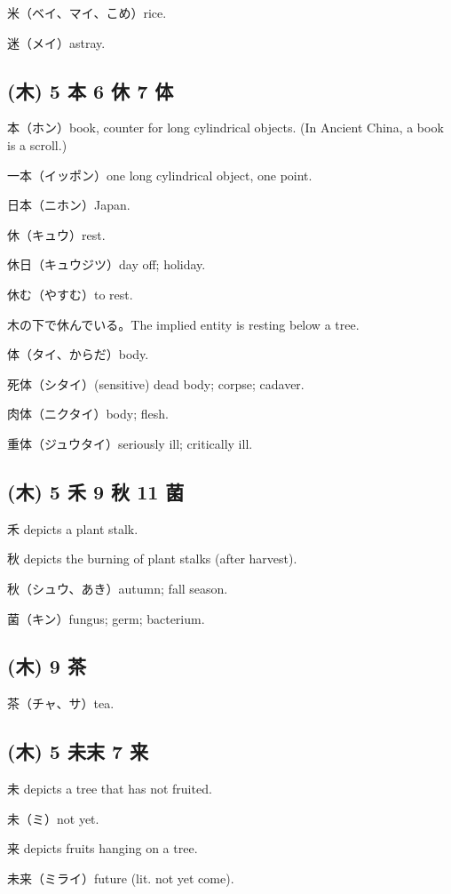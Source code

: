 米（ベイ、マイ、こめ）rice.

迷（メイ）astray.

\subsection{(木) 5 本 6 休 7 体}

本（ホン）book, counter for long cylindrical objects.
(In Ancient China, a book is a scroll.)

一本（イッポン）one long cylindrical object, one point.

日本（ニホン）Japan.

休（キュウ）rest.

休日（キュウジツ）day off; holiday.

休む（やすむ）to rest.

木の下で休んでいる。The implied entity is resting below a tree.

体（タイ、からだ）body.

死体（シタイ）(sensitive) dead body; corpse; cadaver.

肉体（ニクタイ）body; flesh.

重体（ジュウタイ）seriously ill; critically ill.

\subsection{(木) 5 禾 9 秋 11 菌}

禾 depicts a plant stalk.

秋 depicts the burning of plant stalks (after harvest).

秋（シュウ、あき）autumn; fall season.

菌（キン）fungus; germ; bacterium.

\subsection{(木) 9 茶}

茶（チャ、サ）tea.

\subsection{(木) 5 未末 7 来}

未 depicts a tree that has not fruited.

未（ミ）not yet.

来 depicts fruits hanging on a tree.

未来（ミライ）future (lit. not yet come).

